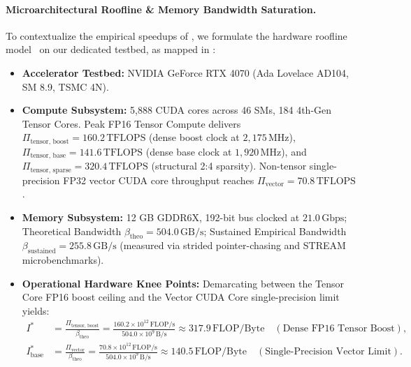 \paragraph{Microarchitectural Roofline \& Memory Bandwidth Saturation.}
To contextualize the empirical speedups of , we formulate the hardware roofline model~\cite{williams2009roofline} on our dedicated testbed, as mapped in :
\begin{itemize}
    \item \textbf{Accelerator Testbed:} NVIDIA GeForce RTX 4070 (Ada Lovelace AD104, SM 8.9, TSMC 4N).
    \item \textbf{Compute Subsystem:} 5,888 CUDA cores across 46 SMs, 184 4th-Gen Tensor Cores. Peak FP16 Tensor Compute delivers $\Pi_{\text{tensor, boost}} = 160.2\,\text{TFLOPS}$ (dense boost clock at $2,175\,\text{MHz}$), $\Pi_{\text{tensor, base}} = 141.6\,\text{TFLOPS}$ (dense base clock at $1,920\,\text{MHz}$), and $\Pi_{\text{tensor, sparse}} = 320.4\,\text{TFLOPS}$ (structural 2:4 sparsity). Non-tensor single-precision FP32 vector CUDA core throughput reaches $\Pi_{\text{vector}} = 70.8\,\text{TFLOPS}$.
    \item \textbf{Memory Subsystem:} 12 GB GDDR6X, 192-bit bus clocked at $21.0\,\text{Gbps}$; Theoretical Bandwidth $\beta_{\text{theo}} = 504.0\,\text{GB/s}$; Sustained Empirical Bandwidth $\beta_{\text{sustained}} = 255.8\,\text{GB/s}$ (measured via strided pointer-chasing and STREAM microbenchmarks).
    \item \textbf{Operational Hardware Knee Points:} Demarcating between the Tensor Core FP16 boost ceiling and the Vector CUDA Core single-precision limit yields:
    \begin{align}
    \label{eq:roofline_ridge_tensor}
    I^* &= \frac{\Pi_{\text{tensor, boost}}}{\beta_{\text{theo}}} = \frac{160.2 \times 10^{12}\,\text{FLOP/s}}{504.0 \times 10^9\,\text{B/s}} \approx 317.9\,\text{FLOP/Byte} \quad (\text{Dense FP16 Tensor Boost}), \\
    \label{eq:roofline_ridge_vector}
    I^*_{\text{base}} &= \frac{\Pi_{\text{vector}}}{\beta_{\text{theo}}} = \frac{70.8 \times 10^{12}\,\text{FLOP/s}}{504.0 \times 10^9\,\text{B/s}} \approx 140.5\,\text{FLOP/Byte} \quad (\text{Single-Precision Vector Limit}).
    \end{align}
\end{itemize}

